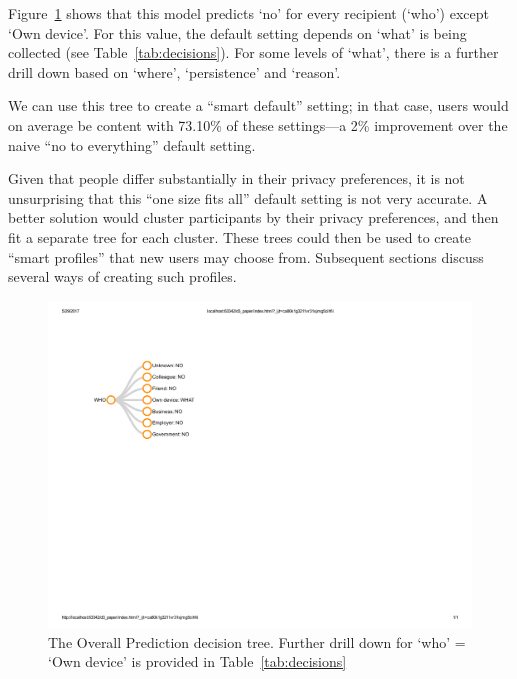 Figure~\ref{fig:naive_cls} shows that this model predicts `no' for every recipient (`who') except `Own device'. For this value, the default setting depends on `what' is being collected (see Table~\ref{tab:decisions}). For some levels of `what', there is a further drill down based on `where', `persistence' and `reason'.

We can use this tree to create a ``smart default'' setting; in that case, users would on average be content with 73.10\% of these settings---a 2\% improvement over the naive ``no to everything'' default setting. 

Given that people differ substantially in their privacy preferences, it is not unsurprising that this ``one size fits all'' default setting is not very accurate. A better solution would cluster participants by their privacy preferences, and then fit a separate tree for each cluster. These trees could then be used to create ``smart profiles'' that new users may choose from. Subsequent sections discuss several ways of creating such profiles.

\begin{figure}
	\centering
	\includegraphics[width=.22\textwidth]{figures/overall.pdf}
	\caption{The Overall Prediction decision tree. Further drill down for `who' = `Own device' is provided in Table~\ref{tab:decisions}}
	\label{fig:naive_cls}
\end{figure}

